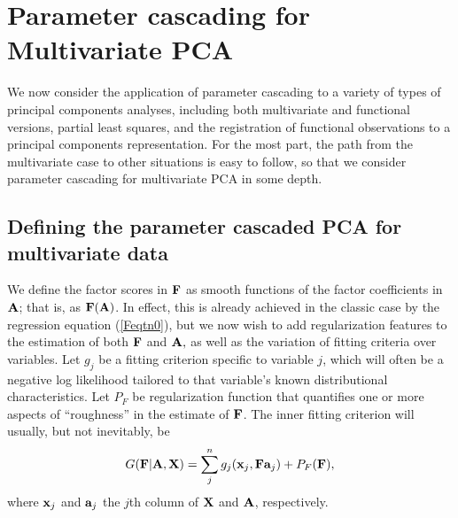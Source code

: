 \documentclass[12pt]{article}
\begin{document}
\section{Parameter cascading for Multivariate PCA}
\label{sec:PCforPCA}

We now consider the application of parameter cascading to a variety of types of principal components analyses, including both multivariate and functional versions, partial least squares, and the registration of functional observations to a principal components representation.  For the most part, the path from the multivariate case to other situations is easy to follow, so that we consider parameter cascading for multivariate PCA in some depth.


\subsection{Defining the parameter cascaded PCA for multivariate data}
\label{subsec:PCforMPCA}

We define the factor scores in $\mbox{\bf F}$ as smooth functions of the factor coefficients in $\mbox{\bf A}$; that is, as $\mbox{\bf F}(\mbox{\bf A})$.  In effect, this is already achieved in the classic case by the regression equation (\ref{Feqtn0}), but we now wish to add regularization features to the estimation of both $\mbox{\bf F}$ and $\mbox{\bf A},$  as well as the variation of fitting criteria over variables.  Let $g_j$ be a fitting criterion specific to variable $j$, which will often be a negative log likelihood tailored to that variable's known distributional characteristics.  Let $P_F$ be regularization function that quantifies one or more aspects of ``roughness'' in the estimate of $\mbox{\bf F}$.  The inner fitting criterion will usually, but not inevitably, be
\begin{equation} \label{Geqtn1}
  G(\mbox{\bf F}|\mbox{\bf A},\mbox{\bf X}) = \sum_j^n g_j(\mbox{\bf x}_j, \mbox{\bf F} \mbox{\bf a}_j) + P_F(\mbox{\bf F}),
\end{equation}
where $\mbox{\bf x}_j$ and $\mbox{\bf a}_j$ the $j$th column of $\mbox{\bf X}$ and $\mbox{\bf A}$, respectively.
\end{document}
